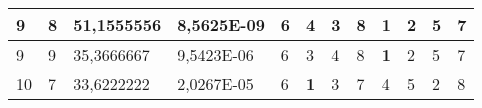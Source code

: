 \documentclass[conference]{IEEEtran}
\begin{document}
\begin{table*}[]
\begin{tabular}{|llll|llllllll|}
\multicolumn{1}{|l|}{9}                                                     & \multicolumn{1}{l|}{8}                                                        & \multicolumn{1}{l|}{51,1555556}                                                   & 8,5625E-09                     & \multicolumn{1}{l|}{6}                                                  & \multicolumn{1}{l|}{4}                                                  & \multicolumn{1}{l|}{3}                                                  & \multicolumn{1}{l|}{8}                                                  & \multicolumn{1}{l|}{\textbf{1}}                                         & \multicolumn{1}{l|}{2}                                                  & \multicolumn{1}{l|}{5}                                                  & 7                          \\ \hline
\multicolumn{1}{|l|}{9}                                                     & \multicolumn{1}{l|}{9}                                                        & \multicolumn{1}{l|}{35,3666667}                                                   & 9,5423E-06                     & \multicolumn{1}{l|}{6}                                                  & \multicolumn{1}{l|}{3}                                                  & \multicolumn{1}{l|}{4}                                                  & \multicolumn{1}{l|}{8}                                                  & \multicolumn{1}{l|}{\textbf{1}}                                         & \multicolumn{1}{l|}{2}                                                  & \multicolumn{1}{l|}{5}                                                  & 7                          \\ \hline
\multicolumn{1}{|l|}{10}                                                    & \multicolumn{1}{l|}{7}                                                        & \multicolumn{1}{l|}{33,6222222}                                                   & 2,0267E-05                     & \multicolumn{1}{l|}{6}                                                  & \multicolumn{1}{l|}{\textbf{1}}                                         & \multicolumn{1}{l|}{3}                                                  & \multicolumn{1}{l|}{7}                                                  & \multicolumn{1}{l|}{4}                                                  & \multicolumn{1}{l|}{5}                                                  & \multicolumn{1}{l|}{2}                                                  & 8                          \\ \hline

\end{tabular}
\end{table*}
\end{document}
